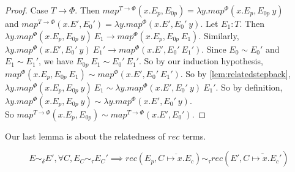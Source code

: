 \begin{proof}
  Case $T \to \Phi$.
  Then $map^{T \to \Phi}(x. E_p, E_{0p}) = \lambda y.map^\Phi(x.E_p, E_{0p}\ y)$ \\
  and $map^{T \to \Phi}(x. E', E_0') = \lambda y.map^\Phi(x.E', E_0'\ y)$.
  Let $E_1 : T$.
  Then \\
  $\lambda y.map^\Phi(x.E_p, E_{0p}\ y)\ E_1 \to map^\Phi(x.E_p, E_{0p}\ E_1)$.
  Similarly, $\lambda y.map^\Phi(x.E', E_0'\ y)\ E_1' \to map^\Phi(x. E', E_0'\ E_1')$.
  Since $E_0 \sim E_0'$ and $E_1 \sim E_1'$, we have $E_{0p}\ E_1 \sim E_0'\ E_1'$.
  So by our induction hypothesis, $map^\Phi(x.E_p, E_{0p}\ E_1) \sim map^\Phi(x. E', E_0'\ E_1')$.
  So by \ref{lem:relatedstepback}, $\lambda y.map^\Phi(x.E_p, E_{0p}\ y)\ E_1 \sim \lambda y.map^\Phi(x.E', E_0'\ y)\ E_1'$.
  So by definition, \\
  $\lambda y.map^\Phi(x.E_p, E_{0p}\ y) \sim \lambda y.map^\Phi(x.E', E_0'\ y)$.\\
  So $map^{T \to \Phi}(x. E_p, E_{0p}) \sim map^{T \to \Phi}(x. E', E_0')$.
\end{proof}
%
Our last lemma is about the relatedness of $rec$ terms.
%
\begin{lemma}
  \label{lem:relatedrec}
  \[ E \sim_\delta E', \forall C, E_C \sim_\tau E_C' \implies rec(E_p, \overline{C \mapsto x.E_c}) \sim_\tau rec(E', \overline{C \mapsto x.E_c'}) \]
\end{lemma}
%
